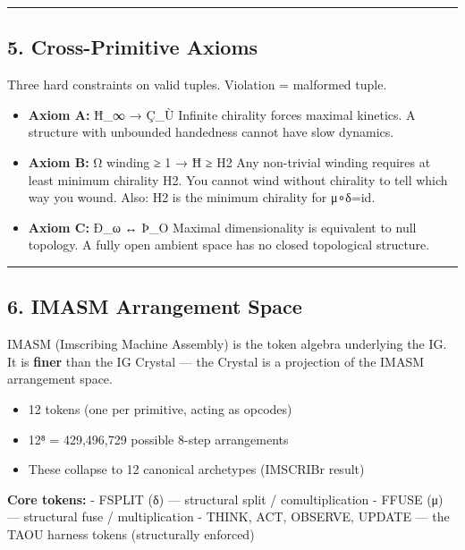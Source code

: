\begin{center}\rule{0.5\linewidth}{0.5pt}\end{center}

\hypertarget{cross-primitive-axioms}{%
\subsection{5. Cross-Primitive Axioms}\label{cross-primitive-axioms}}

Three hard constraints on valid tuples. Violation = malformed tuple.

\begin{itemize}
\item
  \textbf{Axiom A:} Ħ\_∞ → Ç\_Ù Infinite chirality forces maximal
  kinetics. A structure with unbounded handedness cannot have slow
  dynamics.
\item
  \textbf{Axiom B:} Ω winding ≥ 1 → Ħ ≥ H2 Any non-trivial winding
  requires at least minimum chirality H2. You cannot wind without
  chirality to tell which way you wound. Also: H2 is the minimum
  chirality for μ∘δ=id.
\item
  \textbf{Axiom C:} Ð\_ω ↔ Þ\_O Maximal dimensionality is equivalent to
  null topology. A fully open ambient space has no closed topological
  structure.
\end{itemize}

\begin{center}\rule{0.5\linewidth}{0.5pt}\end{center}

\hypertarget{imasm-arrangement-space}{%
\subsection{6. IMASM Arrangement Space}\label{imasm-arrangement-space}}

IMASM (Imscribing Machine Assembly) is the token algebra underlying the
IG. It is \textbf{finer} than the IG Crystal --- the Crystal is a
projection of the IMASM arrangement space.

\begin{itemize}
\tightlist
\item
  12 tokens (one per primitive, acting as opcodes)
\item
  12⁸ = 429,496,729 possible 8-step arrangements
\item
  These collapse to 12 canonical archetypes (IMSCRIBr result)
\end{itemize}

\textbf{Core tokens:} - FSPLIT (δ) --- structural split /
comultiplication - FFUSE (μ) --- structural fuse / multiplication -
THINK, ACT, OBSERVE, UPDATE --- the TAOU harness tokens (structurally
enforced)

